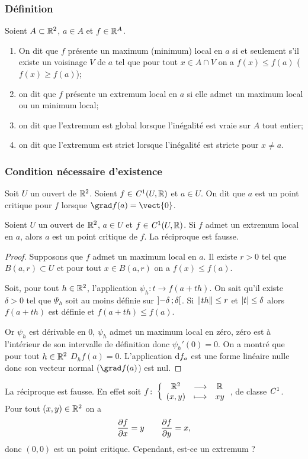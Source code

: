 \subsubsection{Définition}

\begin{defdef}
  Soient $A \subset \mathbb{R}^2$, $a \in A$ et $f \in \mathbb{R}^A$.
  \begin{enumerate}
  \item On dit que $f$ présente un maximum (minimum) local en $a$ si et seulement s'il existe un voisinage $V$ de $a$ tel que pour tout $x \in A \cap V$ on a $f(x) \leq f(a)$ ($f(x) \geq f(a)$);
  \item on dit que $f$ présente un extremum local en $a$ si elle admet un maximum local ou un minimum local;
  \item on dit que l'extremum est global lorsque l'inégalité est vraie sur $A$ tout entier;
  \item on dit que l'extremum est strict lorsque l'inégalité est stricte pour $x \neq a$.
  \end{enumerate}
\end{defdef}

\subsubsection{Condition nécessaire d'existence}

\begin{defdef}
  Soit $U$ un ouvert de $\mathbb{R}^2$. Soient $f \in \mathit{C}^1(U, \mathbb{R})$ et $a \in U$. On dit que $a$ est un point critique pour $f$ lorsque $\grad f(a)=\vect{0}$.
\end{defdef}

\begin{theo}
  Soient $U$ un ouvert de $\mathbb{R}^2$, $a \in U$ et $f \in \mathit{C}^1(U, \mathbb{R})$. Si $f$ admet un extremum local en $a$, alors $a$ est un point critique de $f$. La réciproque est fausse.
\end{theo}
\begin{proof}
  Supposons que $f$ admet un maximum local en $a$. Il existe $r>0$ tel que $B(a, r) \subset U$ et pour tout $x \in B(a, r)$ on a $f(x)\leq f(a)$. 

  Soit, pour tout $h\in \mathbb{R}^2$, l'application $\psi_h: t \rightarrow f(a+th)$. On sait qu'il existe $\delta>0$ tel que $\Psi_h$ soit au moins définie sur $\left] -\delta \, ;  \delta \right[$. Si $\left\lVert th\right\rVert\leq r$ et $\left\lvert t\right\rvert\leq \delta$ alors $f(a+th)$ est définie et $f(a+th) \leq f(a)$. 

Or $\psi_h$ est dérivable en $0$, $\psi_h$ admet un maximum local en zéro, zéro est à l'intérieur de son intervalle de définition donc $\psi_h'(0)=0$. On a montré que pour tout $h \in \mathbb{R}^2$ $D_h f(a)=0$. L'application $\mathrm{d} f_a$ est une forme linéaire nulle donc son vecteur normal ($\grad f(a)$) est nul.
\end{proof}
%
La réciproque est fausse. En effet soit $f\colon \left\{\begin{array}{ccc} \mathbb{R}^2 & \longrightarrow &\mathbb{R}\\ (x,y) & \longmapsto & xy \end{array} \right.$, de classe $\mathit{C}^1$. Pour tout $(x,y) \in \mathbb{R}^2$ on a
\begin{equation}
  \dfrac{\partial f}{\partial x} = y \qquad \dfrac{\partial f}{\partial y} = x,
\end{equation}
donc $(0, 0)$ est un point critique. Cependant, est-ce un extremum ?


